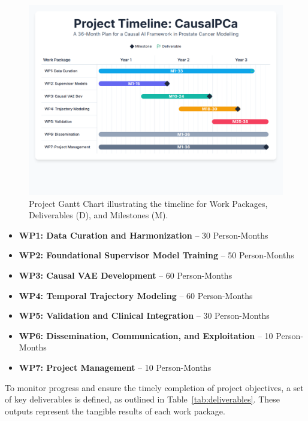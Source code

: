 \documentclass[11pt, a4paper]{article}
\begin{document}
\begin{figure}[H]
    \centering
    \includegraphics[width=\textwidth]{gantt.png}
    \caption{Project Gantt Chart illustrating the timeline for Work Packages, Deliverables (D), and Milestones (M).}
    \label{fig:gantt}
\end{figure}

\begin{itemize}
    \item \textbf{WP1: Data Curation and Harmonization} -- 30 Person-Months
    \item \textbf{WP2: Foundational Supervisor Model Training} -- 50 Person-Months
    \item \textbf{WP3: Causal VAE Development} -- 60 Person-Months
    \item \textbf{WP4: Temporal Trajectory Modeling} -- 60 Person-Months
    \item \textbf{WP5: Validation and Clinical Integration} -- 30 Person-Months
    \item \textbf{WP6: Dissemination, Communication, and Exploitation} -- 10 Person-Months
    \item \textbf{WP7: Project Management} -- 10 Person-Months
\end{itemize}

To monitor progress and ensure the timely completion of project objectives, a set of key deliverables is defined, as outlined in Table~\ref{tab:deliverables}. These outputs represent the tangible results of each work package.
\end{document}

